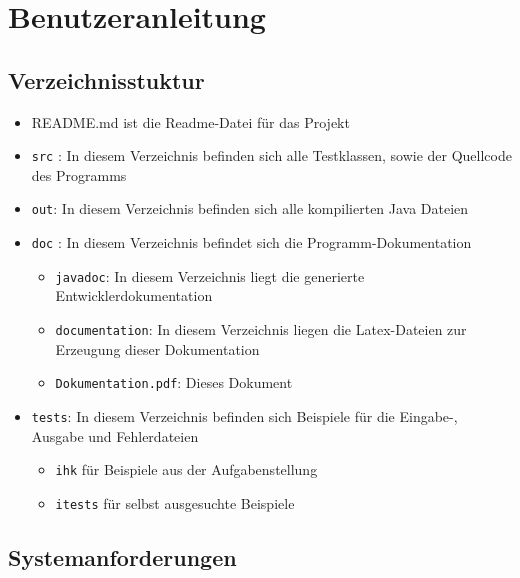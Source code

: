 %

\chapter{Benutzeranleitung}

\section{Verzeichnisstuktur}

\begin{itemize}
    \item README.md ist die Readme-Datei für das Projekt
    \item \texttt{src} : In diesem Verzeichnis befinden sich alle Testklassen, sowie der Quellcode des Programms
    \item \texttt{out}: In diesem Verzeichnis befinden sich alle kompilierten Java Dateien
    \item \texttt{doc} : In diesem Verzeichnis befindet sich die Programm-Dokumentation
    \begin{itemize}
        \item \texttt{javadoc}: In diesem Verzeichnis liegt die generierte Entwicklerdokumentation
        \item \texttt{documentation}: In diesem Verzeichnis liegen die Latex-Dateien zur Erzeugung dieser Dokumentation
        \item \texttt{Dokumentation.pdf}: Dieses Dokument
    \end{itemize}
    \item \texttt{tests}: In diesem Verzeichnis befinden sich Beispiele für die Eingabe-, Ausgabe und Fehlerdateien
    \begin{itemize}
        \item \texttt{ihk} für Beispiele aus der Aufgabenstellung
        \item \texttt{itests} für selbst ausgesuchte Beispiele 
    \end{itemize}
\end{itemize}

\section{Systemanforderungen}

